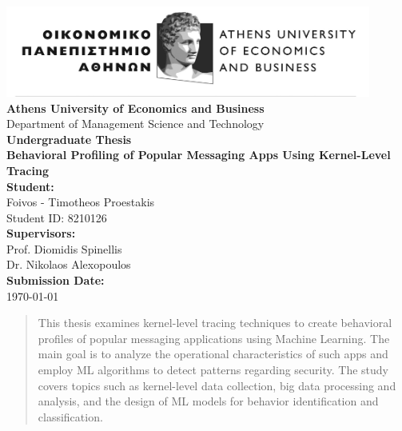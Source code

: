 \documentclass[a4paper,12pt]{report}
\begin{document}
\begin{titlepage}
    \begin{center}
        \vspace*{1.5cm}

        \includegraphics[width=0.9\textwidth]{./aueb_logo.png}\\[1cm]

        {\Large \textbf{Athens University of Economics and Business}}\\[0.5cm]
        {\large Department of Management Science and Technology}\\[1.5cm]

        {\Huge \textbf{Undergraduate Thesis}}\\[1.2cm]
        {\Large \textbf{Behavioral Profiling of Popular Messaging Apps Using Kernel-Level Tracing}}\\[2cm]

        \textbf{Student:}\\
        Foivos - Timotheos Proestakis\\
        Student ID: 8210126\\[1.5cm]

        \textbf{Supervisors:}\\
        Prof. Diomidis Spinellis \\
        Dr. Nikolaos Alexopoulos\\[1.5cm]

        \vfill
        \textbf{Submission Date:}\\
        \today
        \vspace*{1cm}
    \end{center}
\end{titlepage}
\clearpage


\begin{abstract}
This thesis examines kernel-level tracing techniques to create behavioral profiles of popular messaging applications using Machine Learning. The main goal is to analyze the operational characteristics of such apps and employ ML algorithms to detect patterns regarding security. The study covers topics such as kernel-level data collection, big data processing and analysis, and the design of ML models for behavior identification and classification.
\end{abstract}
\clearpage
\end{document}
